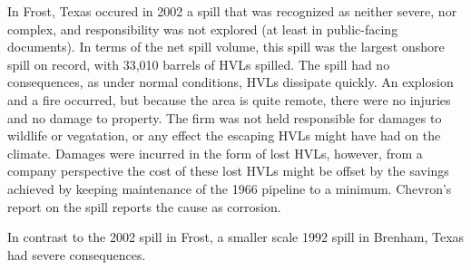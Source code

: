 \documentclass[12pt, man, natbib]{apa6}
\begin{document}
	In Frost, Texas occured in 2002 a spill that was recognized as neither severe, nor complex, and responsibility was not explored (at least in public-facing documents). In terms of the net spill volume, this spill was the largest onshore spill on record, with 33,010 barrels of HVLs spilled. The spill had no consequences, as under normal conditions, HVLs dissipate quickly. An explosion and a fire occurred, but because the area is quite remote, there were no injuries and no damage to property. The firm was not held responsible for damages to wildlife or vegatation, or any effect the escaping HVLs might have had on the climate. Damages were incurred in the form of lost HVLs, however, from a company perspective the cost of these lost HVLs might be offset by the savings achieved by keeping maintenance of the 1966 pipeline to a minimum. Chevron's report on the spill reports the cause as corrosion.
	
	In contrast to the 2002 spill in Frost, a smaller scale 1992 spill in Brenham, Texas had severe consequences. 
	
%	
%		
%	
	


\end{document}
